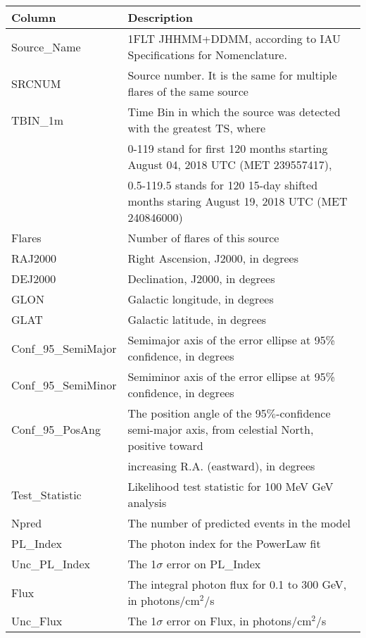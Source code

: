 {}
\begin{tabular}{ll} 
\hline
\hline
  \multicolumn{1}{l}{Column}&
  \multicolumn{1}{l}{Description}\\
\hline
  Source\_Name  & 1FLT JHHMM+DDMM, according to IAU Specifications for Nomenclature.\\
  SRCNUM & Source number. It is the same for multiple flares of the same source\\
  TBIN\_1m & Time Bin in which the source was detected with the greatest TS, where \\ & 0-119 stand for first 120 months starting August 04, 2018 UTC (MET 239557417), \\ & 0.5-119.5 stands for 120 15-day shifted months staring August 19, 2018 UTC (MET 240846000)\\
  Flares & Number of flares of this source\\
  RAJ2000  & Right Ascension, J2000, in degrees\\
  DEJ2000 & Declination, J2000, in degrees\\
  GLON & Galactic longitude, in degrees\\
  GLAT & Galactic latitude, in degrees\\
  Conf\_95\_SemiMajor & Semimajor axis of the error ellipse at 95\% confidence, in degrees\\
  Conf\_95\_SemiMinor & Semiminor axis of the error ellipse at 95\% confidence, in degrees\\
  Conf\_95\_PosAng & The position angle of the 95$\%$-confidence semi-major axis, from celestial North, positive toward\\ 
  & increasing R.A. (eastward), in degrees\\
  Test\_Statistic & Likelihood test statistic for 100 MeV\textendash 300 GeV analysis\\
  Npred & The number of predicted events in the model\\
  PL\_Index & The photon index for the PowerLaw fit\\
  Unc\_PL\_Index &  The 1$\sigma$ error on PL\_Index\\ 
  Flux & The integral photon flux for 0.1 to 300 GeV, in photons/cm$^2$/s\\
  Unc\_Flux &  The 1$\sigma$ error on Flux, in photons/cm$^2$/s\\

\end{tabular}
